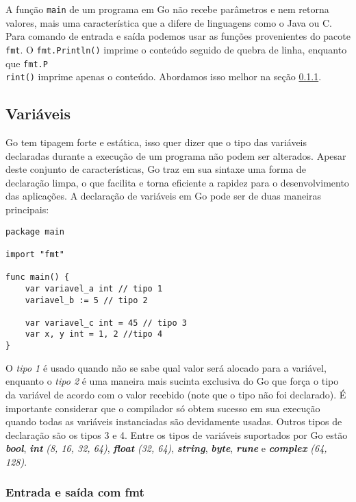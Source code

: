 \documentclass{SBCbookchapter}
\begin{document}
A função \texttt{main} de um programa em Go não recebe parâmetros e nem retorna valores, mais uma característica que a difere de linguagens como o Java ou C.
Para comando de entrada e saída podemos usar as funções provenientes do pacote \texttt{fmt}. O \texttt{fmt.Println()} imprime o conteúdo seguido de quebra de linha, enquanto que \texttt{fmt.P\\rint()} imprime apenas o conteúdo. Abordamos isso melhor na seção \ref{secaodeio}.

\subsection{Variáveis}

Go tem tipagem forte e estática, isso quer dizer que o tipo das variáveis declaradas durante a execução de um programa não podem ser alterados. Apesar deste conjunto de características, Go traz em sua sintaxe uma forma de declaração limpa, o que facilita e torna eficiente a rapidez para o desenvolvimento das aplicações. A declaração de variáveis em Go pode ser de duas maneiras principais:

\begin{lstlisting}
package main

import "fmt"

func main() {
	var variavel_a int // tipo 1
	variavel_b := 5 // tipo 2
	
	var variavel_c int = 45 // tipo 3
	var x, y int = 1, 2 //tipo 4
}
\end{lstlisting}

O \textit{tipo 1} é usado quando não se sabe qual valor será alocado para a variável, enquanto o \textit{tipo 2} é uma maneira mais sucinta exclusiva do Go que força o tipo da variável de acordo com o valor recebido (note que o tipo não foi declarado). É importante considerar que o compilador só obtem sucesso em sua execução quando todas as variáveis instanciadas são devidamente usadas. Outros tipos de declaração são os tipos 3 e 4. Entre os tipos de variáveis suportados por Go estão \textbf{\textit{bool}}, \textbf{\textit{int}} \textit{(8, 16, 32, 64)}, \textbf{\textit{float}} \textit{(32, 64)}, \textbf{\textit{string}}, \textbf{\textit{byte}}, \textbf{\textit{rune}} e \textbf{\textit{complex}} \textit{(64, 128)}.

\subsubsection{Entrada e saída com fmt}
\label{secaodeio}
\end{document}
